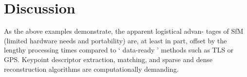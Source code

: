 \documentclass[twoside,twocolumn]{article}
\begin{document}

\section{Discussion}
As the above examples demonstrate, the apparent logistical advan-
tages of SfM (limited hardware needs and portability) are, at least in
part, offset by the lengthy processing times compared to
‘
data-ready
’
methods such as TLS or GPS. Keypoint descriptor extraction, matching,
and sparse and dense reconstruction algorithms are computationally
demanding.

\printbibliography
\end{document}
